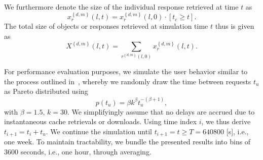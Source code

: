 \documentclass[letterpaper,conference]{IEEEtran}
\begin{document}
We furthermore denote the size of the individual response retrieved at time $t$ as 
\begin{equation}
x_{r}^{\left\{ d,m \right\}}(l,t) = x_{r}^{\left\{ d,m \right\}}(l,0) \cdot \left[ t_c \ge t \right].
\end{equation}
The total size of objects or responses retrieved at simulation time $t$ thus is given as 
\begin{equation}
X^{\left\{ d,m \right\}}(l,t) =\sum_{r^{\left\{ d,m \right\}}(l,0)} x_{r}^{\left\{ d,m \right\}}(l,t).
\end{equation}


For performance evaluation purposes, we simulate the user behavior similar to the process outlined in~\cite{AnCoGrPa03}, whereby we randomly draw the time between requests $t_u$ as Pareto distributed using
\begin{equation}
p(t_u)=\beta k^\beta t_u^{-(\beta+1)},
\end{equation}
 with $\beta=1.5$, $k=30$.
We simplifyingly assume that no delays are accrued due to instantaneous cache retrievals or downloads. 
Using time index $i$, we thus derive $t_{i+1}=t_i + t_u$.
We continue the simulation until $t_{i+1} = t \ge T =  640800$ [s], i.e., one week.
To maintain tractability, we bundle the presented results into bins of 3600 seconds, i.e., one hour, through averaging.


%
%
%
\end{document}
